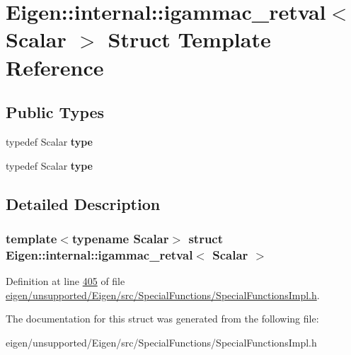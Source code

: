 \hypertarget{struct_eigen_1_1internal_1_1igammac__retval}{}\section{Eigen\+:\+:internal\+:\+:igammac\+\_\+retval$<$ Scalar $>$ Struct Template Reference}
\label{struct_eigen_1_1internal_1_1igammac__retval}
\subsection*{Public Types}
\begin{DoxyCompactItemize}
\item 
\mbox{\label{struct_eigen_1_1internal_1_1igammac__retval_afc473bfd4bd79bb90490e3e5a6a256cf}} 
typedef Scalar {\bfseries type}
\item 
\mbox{\label{struct_eigen_1_1internal_1_1igammac__retval_afc473bfd4bd79bb90490e3e5a6a256cf}} 
typedef Scalar {\bfseries type}
\end{DoxyCompactItemize}


\subsection{Detailed Description}
\subsubsection*{template$<$typename Scalar$>$\newline
struct Eigen\+::internal\+::igammac\+\_\+retval$<$ Scalar $>$}



Definition at line \hyperlink{eigen_2unsupported_2_eigen_2src_2_special_functions_2_special_functions_impl_8h_source_l00405}{405} of file \hyperlink{eigen_2unsupported_2_eigen_2src_2_special_functions_2_special_functions_impl_8h_source}{eigen/unsupported/\+Eigen/src/\+Special\+Functions/\+Special\+Functions\+Impl.\+h}.



The documentation for this struct was generated from the following file\+:\begin{DoxyCompactItemize}
\item 
eigen/unsupported/\+Eigen/src/\+Special\+Functions/\+Special\+Functions\+Impl.\+h\end{DoxyCompactItemize}
